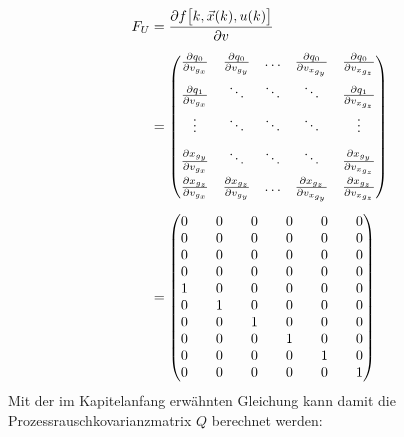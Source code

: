 \documentclass[12pt,a4paper]{article}
\newcommand{\PA}[2]{\frac{\partial #1}{\partial #2}}
\begin{document}
		\begin{align}
				F_{U}&=\frac{\partial f\big[k,\vec{x}(k),u(k)\big]}{\partial v} \\[0.5em]
				&=\begin{pmatrix}
				\PA{q_{0}}{v_{g_{x}}} & \PA{q_{0}}{v_{g_{y}}} & \ldots & \PA{q_{0}}{v_{x_{g_{y}}}} & \PA{q_{0}}{v_{x_{g_{z}}}} \\[0.5em]
				\PA{q_{1}}{v_{g_{x}}} & \ddots & \ddots & \ddots & \PA{q_{1}}{v_{x_{g_{z}}}} \\[0.5em]
				\vdots & \ddots & \ddots & \ddots & \vdots \\[0.5em]
				\PA{x_{g_{y}}}{v_{g_{x}}} & \ddots & \ddots & \ddots & \PA{x_{g_{y}}}{v_{x_{g_{z}}}} \\[0.5em]
				\PA{x_{g_{z}}}{v_{g_{x}}} & \PA{x_{g_{z}}}{v_{g_{y}}} & \ldots & \PA{x_{g_{z}}}{v_{x_{g_{y}}}} & \PA{x_{g_{z}}}{v_{x_{g_{z}}}}
				\end{pmatrix}\\[0.5em]
				&=
				\arraycolsep=10pt %
				\begin{pmatrix}
				0 & 0 & 0 & 0 & 0 & 0 \\
				0 & 0 & 0 & 0 & 0 & 0 \\
				0 & 0 & 0 & 0 & 0 & 0 \\
				0 & 0 & 0 & 0 & 0 & 0 \\
				1 & 0 & 0 & 0 & 0 & 0 \\
				0 & 1 & 0 & 0 & 0 & 0 \\
				0 & 0 & 1 & 0 & 0 & 0 \\
				0 & 0 & 0 & 1 & 0 & 0 \\
				0 & 0 & 0 & 0 & 1 & 0 \\
				0 & 0 & 0 & 0 & 0 & 1
				\end{pmatrix}
		\end{align}
		Mit der im Kapitelanfang erwähnten Gleichung kann damit die Prozessrauschkovarianzmatrix $Q$ berechnet werden:
\end{document}
